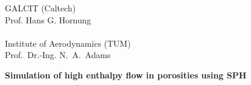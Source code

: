 


% 

\pagestyle{empty}

\begin{center}

\vspace*{-2.8cm}
\begin{minipage}[c]{.30\textwidth}
\end{minipage}
\begin{minipage}[c]{.43\textwidth}
\vspace*{1em}
    {GALCIT (Caltech)\\Prof. Hans G. Hornung \\ \\ Institute of Aerodynamics (TUM) \\ Prof.~Dr.-Ing. N.~A.~Adams}%
\end{minipage}
\begin{minipage}[c]{.25\textwidth}
\end{minipage}

\vspace*{3.3cm}
\begin{minipage}[c]{11cm}
{\LARGE\bf 
Simulation of high enthalpy flow in porosities using SPH}
\end{minipage}




\vspace*{1.0cm}


\end{center}
